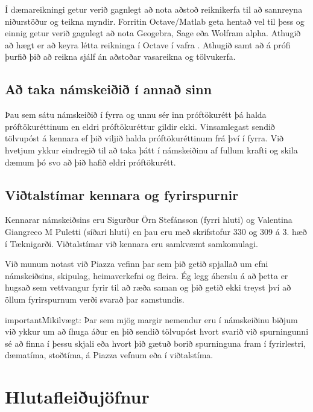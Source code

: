 \documentclass[a4paper,10pt,icelandic]{sphinxmanual}
\begin{document}
Í dæmareikningi getur verið gagnlegt að nota aðstoð reiknikerfa til að sannreyna niðurstöður og teikna myndir. Forritin Octave/Matlab geta hentað vel til þess og einnig getur verið gagnlegt að nota Geogebra, Sage eða Wolfram alpha. Athugið að hægt er að keyra létta reikninga í Octave í vafra . Athugið samt að á prófi þurfið þið að reikna sjálf án aðstoðar vasareikna og tölvukerfa.


\section{Að taka námskeiðið í annað sinn}
\label{\detokenize{umnamskeidid:a-taka-namskeii-i-anna-sinn}}
Þau sem sátu námskeiðið í fyrra og unnu sér inn próftökurétt þá halda
próftökuréttinum en eldri próftökuréttur gildir ekki. Vinsamlegast
sendið tölvupóst á kennara ef þið viljið halda próftökuréttinum frá því í
fyrra.  Við hvetjum ykkur eindregið til að taka þátt í námskeiðinu af
fullum krafti og skila dæmum þó svo að þið hafið eldri próftökurétt.


\section{Viðtalstímar kennara og fyrirspurnir}
\label{\detokenize{umnamskeidid:vitalstimar-kennara-og-fyrirspurnir}}
Kennarar námskeiðsins eru Sigurður Örn Stefánsson (fyrri hluti) og Valentina Giangreco M Puletti (síðari hluti) en þau eru með skrifstofur 330 og 309 á 3. hæð í Tæknigarði. Viðtalstímar við kennara eru samkvæmt samkomulagi.

Við munum notast við Piazza vefinn þar sem þið getið spjallað um efni námskeiðsins, skipulag, heimaverkefni og fleira. Ég legg áherslu á að þetta er hugsað sem vettvangur fyrir  til að ræða saman og þið getið ekki treyst því að öllum fyrirspurnum verði svarað þar samstundis.

\begin{sphinxadmonition}{important}{Mikilvægt:}
Þar sem mjög margir nemendur eru í námskeiðinu biðjum við  ykkur um að íhuga áður en þið sendið tölvupóst hvort svarið við spurningunni sé að finna í þessu skjali eða hvort þið gætuð borið spurninguna fram í fyrirlestri, dæmatíma, stoðtíma, á Piazza vefnum eða í viðtalstíma.
\end{sphinxadmonition}


\chapter{Hlutafleiðujöfnur}
\label{\detokenize{Kafli01:hlutafleiujofnur}}\label{\detokenize{Kafli01::doc}}
\end{document}
